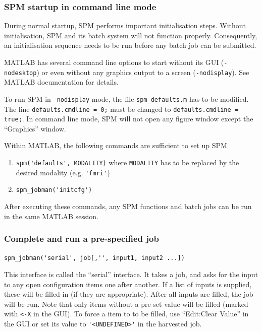 \subsubsection{SPM startup in command line mode}
\label{sec:batch_interface_spm_startup}

During normal startup, SPM performs important initialisation
steps. Without initialisation, SPM and its batch system will not
function properly. Consequently, an initialisation sequence needs to
be run before any batch job can be submitted.

MATLAB has several command line options to start without its GUI
(\verb|-nodesktop|) or even without any graphics output to a screen
(\verb|-nodisplay|). See MATLAB documentation for details.

To run SPM in \verb|-nodisplay| mode, the file \verb|spm_defaults.m|
has to be modified. The line \verb|defaults.cmdline = 0;| must be
changed to \verb|defaults.cmdline = true;|. In command line mode, SPM
will not open any figure window except the ``Graphics'' window. 

Within MATLAB, the following commands are sufficient to set up SPM
\begin{enumerate}
\item \verb|spm('defaults', MODALITY)| where \verb|MODALITY| has to be
  replaced by the desired modality (e.g. \verb|'fmri'|)
\item \verb|spm_jobman('initcfg')|
\end{enumerate}
After executing these commands, any SPM functions and batch jobs
can be run in the same MATLAB session.

\subsubsection{Complete and run a pre-specified job}
\label{sec:batch_interface_cmd_cfg_serial}

\verb|spm_jobman('serial', job[,'', input1, input2 ...])|

This interface is called the ``serial'' interface. It takes a job, and asks
for the input to any open configuration items one after another. If a list of
inputs is supplied, these will be filled in (if they are appropriate). After
all inputs are filled, the job will be run. Note that only items 
without a pre-set value will be filled (marked with \verb|<-X| in
the GUI). To force a item to to be filled, use ``Edit:Clear Value''
in the GUI or set its value to \verb|'<UNDEFINED>'| in the harvested job.

